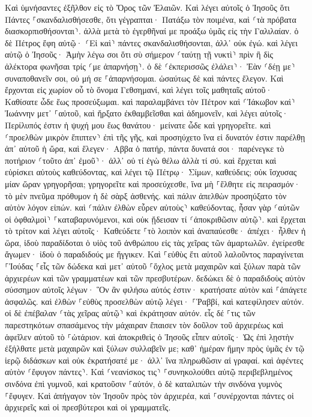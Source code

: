 \documentclass[twoside, 9pt]{extreport}
\begin{document}
Καὶ ὑμνήσαντες ἐξῆλθον εἰς τὸ Ὄρος τῶν Ἐλαιῶν. 
Καὶ λέγει αὐτοῖς ὁ Ἰησοῦς ὅτι Πάντες ⸀σκανδαλισθήσεσθε, ὅτι γέγραπται· Πατάξω τὸν ποιμένα, καὶ ⸂τὰ πρόβατα διασκορπισθήσονται⸃. 
ἀλλὰ μετὰ τὸ ἐγερθῆναί με προάξω ὑμᾶς εἰς τὴν Γαλιλαίαν. 
ὁ δὲ Πέτρος ἔφη αὐτῷ· ⸂Εἰ καὶ⸃ πάντες σκανδαλισθήσονται, ἀλλ᾽ οὐκ ἐγώ. 
καὶ λέγει αὐτῷ ὁ Ἰησοῦς· Ἀμὴν λέγω σοι ὅτι σὺ σήμερον ⸂ταύτῃ τῇ νυκτὶ⸃ πρὶν ἢ δὶς ἀλέκτορα φωνῆσαι τρίς ⸂με ἀπαρνήσῃ⸃. 
ὁ δὲ ⸂ἐκπερισσῶς ἐλάλει⸃· Ἐὰν ⸂δέῃ με⸃ συναποθανεῖν σοι, οὐ μή σε ⸀ἀπαρνήσομαι. ὡσαύτως δὲ καὶ πάντες ἔλεγον. 
Καὶ ἔρχονται εἰς χωρίον οὗ τὸ ὄνομα Γεθσημανί, καὶ λέγει τοῖς μαθηταῖς αὐτοῦ· Καθίσατε ὧδε ἕως προσεύξωμαι. 
καὶ παραλαμβάνει τὸν Πέτρον καὶ ⸂Ἰάκωβον καὶ⸃ Ἰωάννην μετ᾽ ⸀αὐτοῦ, καὶ ἤρξατο ἐκθαμβεῖσθαι καὶ ἀδημονεῖν, 
καὶ λέγει αὐτοῖς· Περίλυπός ἐστιν ἡ ψυχή μου ἕως θανάτου· μείνατε ὧδε καὶ γρηγορεῖτε. 
καὶ ⸂προελθὼν μικρὸν ἔπιπτεν⸃ ἐπὶ τῆς γῆς, καὶ προσηύχετο ἵνα εἰ δυνατόν ἐστιν παρέλθῃ ἀπ᾽ αὐτοῦ ἡ ὥρα, 
καὶ ἔλεγεν· Αββα ὁ πατήρ, πάντα δυνατά σοι· παρένεγκε τὸ ποτήριον ⸂τοῦτο ἀπ᾽ ἐμοῦ⸃· ἀλλ᾽ οὐ τί ἐγὼ θέλω ἀλλὰ τί σύ. 
καὶ ἔρχεται καὶ εὑρίσκει αὐτοὺς καθεύδοντας, καὶ λέγει τῷ Πέτρῳ· Σίμων, καθεύδεις; οὐκ ἴσχυσας μίαν ὥραν γρηγορῆσαι; 
γρηγορεῖτε καὶ προσεύχεσθε, ἵνα μὴ ⸀ἔλθητε εἰς πειρασμόν· τὸ μὲν πνεῦμα πρόθυμον ἡ δὲ σὰρξ ἀσθενής. 
καὶ πάλιν ἀπελθὼν προσηύξατο τὸν αὐτὸν λόγον εἰπών. 
καὶ ⸂πάλιν ἐλθὼν εὗρεν αὐτοὺς⸃ καθεύδοντας, ἦσαν γὰρ ⸂αὐτῶν οἱ ὀφθαλμοὶ⸃ ⸀καταβαρυνόμενοι, καὶ οὐκ ᾔδεισαν τί ⸂ἀποκριθῶσιν αὐτῷ⸃. 
καὶ ἔρχεται τὸ τρίτον καὶ λέγει αὐτοῖς· Καθεύδετε ⸀τὸ λοιπὸν καὶ ἀναπαύεσθε· ἀπέχει· ἦλθεν ἡ ὥρα, ἰδοὺ παραδίδοται ὁ υἱὸς τοῦ ἀνθρώπου εἰς τὰς χεῖρας τῶν ἁμαρτωλῶν. 
ἐγείρεσθε ἄγωμεν· ἰδοὺ ὁ παραδιδούς με ἤγγικεν. 
Καὶ ⸀εὐθὺς ἔτι αὐτοῦ λαλοῦντος παραγίνεται ⸀Ἰούδας ⸀εἷς τῶν δώδεκα καὶ μετ᾽ αὐτοῦ ⸀ὄχλος μετὰ μαχαιρῶν καὶ ξύλων παρὰ τῶν ἀρχιερέων καὶ τῶν γραμματέων καὶ τῶν πρεσβυτέρων. 
δεδώκει δὲ ὁ παραδιδοὺς αὐτὸν σύσσημον αὐτοῖς λέγων· Ὃν ἂν φιλήσω αὐτός ἐστιν· κρατήσατε αὐτὸν καὶ ⸀ἀπάγετε ἀσφαλῶς. 
καὶ ἐλθὼν ⸀εὐθὺς προσελθὼν αὐτῷ λέγει· ⸀Ῥαββί, καὶ κατεφίλησεν αὐτόν. 
οἱ δὲ ἐπέβαλαν ⸂τὰς χεῖρας αὐτῷ⸃ καὶ ἐκράτησαν αὐτόν. 
εἷς δέ ⸀τις τῶν παρεστηκότων σπασάμενος τὴν μάχαιραν ἔπαισεν τὸν δοῦλον τοῦ ἀρχιερέως καὶ ἀφεῖλεν αὐτοῦ τὸ ⸀ὠτάριον. 
καὶ ἀποκριθεὶς ὁ Ἰησοῦς εἶπεν αὐτοῖς· Ὡς ἐπὶ λῃστὴν ἐξήλθατε μετὰ μαχαιρῶν καὶ ξύλων συλλαβεῖν με; 
καθ᾽ ἡμέραν ἤμην πρὸς ὑμᾶς ἐν τῷ ἱερῷ διδάσκων καὶ οὐκ ἐκρατήσατέ με· ἀλλ᾽ ἵνα πληρωθῶσιν αἱ γραφαί. 
καὶ ἀφέντες αὐτὸν ⸂ἔφυγον πάντες⸃. 
Καὶ ⸂νεανίσκος τις⸃ ⸀συνηκολούθει αὐτῷ περιβεβλημένος σινδόνα ἐπὶ γυμνοῦ, καὶ κρατοῦσιν ⸀αὐτόν, 
ὁ δὲ καταλιπὼν τὴν σινδόνα γυμνὸς ⸀ἔφυγεν. 
Καὶ ἀπήγαγον τὸν Ἰησοῦν πρὸς τὸν ἀρχιερέα, καὶ ⸀συνέρχονται πάντες οἱ ἀρχιερεῖς καὶ οἱ πρεσβύτεροι καὶ οἱ γραμματεῖς. 
\end{document}
